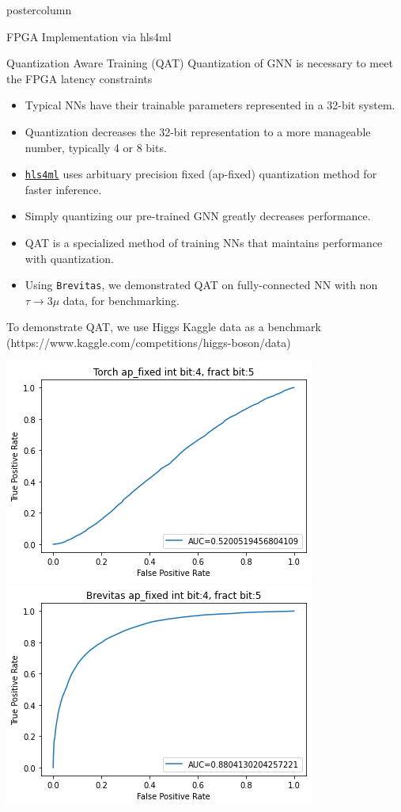 \documentclass[final,hyperref={pdfpagelabels=false}]{beamer}
\newcommand{\hlsfml}{{\href{https://github.com/hls-fpga-machine-learning/hls4ml}{\texttt{hls4ml}}}}
\begin{document}
\begin{frame}
\begin{columns}
\begin{column}{.49\textwidth}
\begin{beamercolorbox}[center,wd=\textwidth]{postercolumn}
\begin{minipage}[T]{.95\textwidth}
{\begin{block}{FPGA Implementation via hls4ml}
            \end{block}
                  \begin{block}{Quantization Aware Training (QAT)}
                    Quantization of GNN is necessary to meet the FPGA latency constraints
                    \begin{itemize}
                    \item Typical NNs have their trainable parameters represented in a 32-bit system.
                    \item Quantization decreases the 32-bit representation to a more manageable number, typically 4 or 8 bits. 
                    \item \hlsfml \; uses arbituary precision fixed (ap-fixed) quantization method for faster inference.
                    \item Simply quantizing our pre-trained GNN greatly decreases performance.
                    \item QAT is a specialized method of training NNs that maintains performance with quantization.
                    \item Using {\tt Brevitas}, we demonstrated QAT on fully-connected NN with non $\tau \rightarrow 3 \mu$ data, for benchmarking.
                    \end{itemize}
                \vspace{0.5in}
                    To demonstrate QAT, we use Higgs Kaggle data as a benchmark (https://www.kaggle.com/competitions/higgs-boson/data)
                   \begin{center}
                \includegraphics[width=0.49\linewidth]{figures/torch_quantized.png}
                \includegraphics[width=0.49\linewidth]{figures/bv_quantized.png}
              \end{center}
                  

\end{block}}
\end{minipage}
\end{beamercolorbox}
\end{column}
\end{columns}
\end{frame}
\end{document}
